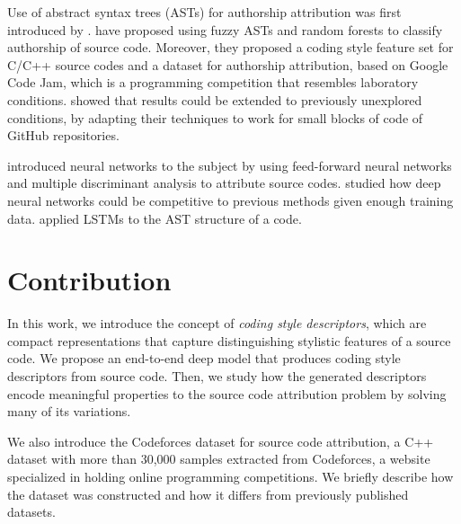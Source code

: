 Use of abstract syntax trees (ASTs) for authorship attribution was first introduced by .  have proposed using fuzzy ASTs and random forests to classify authorship of source code. Moreover, they proposed a coding style feature set for C/C++ source codes and a dataset for authorship attribution, based on Google Code Jam, which is a programming competition that resembles laboratory conditions.  showed that  results could be extended to previously unexplored conditions, by adapting their techniques to work for small blocks of code of GitHub repositories.

 introduced neural networks to the subject by using feed-forward neural networks and multiple discriminant analysis to attribute source codes.  studied how deep neural networks could be competitive to previous methods given enough training data.  applied LSTMs to the AST structure of a code.

\section{Contribution}

In this work, we introduce the concept of \textit{coding style descriptors}, which are compact representations that capture distinguishing stylistic features of a source code. We propose an end-to-end deep model that produces coding style descriptors from source code. Then, we study how the generated descriptors encode meaningful properties to the source code attribution problem by solving many of its variations.

We also introduce the Codeforces dataset for source code attribution, a C++ dataset with more than 30,000 samples extracted from Codeforces, a website specialized in holding online programming competitions. We briefly describe how the dataset was constructed and how it differs from previously published datasets.